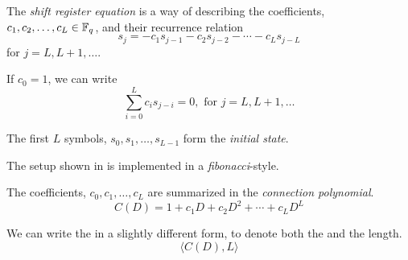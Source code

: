 \begin{definition}\label{def:Shift_Register_Equation}
  The \emph{shift register equation} is a way of describing the coefficients, $c_{1}, c_{2}, \ldots, c_{L} \in \mathbb{F}_{q^{}}$, and their recurrence relation
  \begin{equation}\label{eq:Shift_Register_Equation}
    s_{j} = -c_{1}s_{j-1} - c_{2}s_{j-2} - \cdots - c_{L}s_{j-L}
  \end{equation}
  for $j = L, L+1, \ldots$.

  If  $c_{0} = 1$, we can write
  \begin{equation}\label{eq:Shift_Register_Equation-Summation}
    \sum\limits_{i=0}^{L} c_{i}s_{j-i} = 0, \text{ for } j = L, L+1, \ldots
  \end{equation}

  \begin{remark}\label{rmk:Shift_Register_Initial_State-Fibonacci}
    The first $L$ symbols, $s_{0}, s_{1}, \ldots, s_{L-1}$ form the \emph{initial state}.
  \end{remark}

  \begin{remark}\label{rmk:Shift_Register-Fibonacci}
    The  setup shown in  is implemented in a \emph{fibonacci}-style.
  \end{remark}
\end{definition}

\begin{definition}\label{def:Connection_Polynomial}
  The coefficients, $c_{0}, c_{1}, \ldots, c_{L}$ are summarized in the \emph{connection polynomial}.
  \begin{equation}\label{eq:Connection_Polynomial}
    C(D) = 1 + c_{1}D + c_{2}D^{2} + \cdots + c_{L}D^{L}
  \end{equation}

  \begin{remark}\label{rmk:Connection_Polynomial-Alternate_Form}
    We can write the  in a slightly different form, to denote both the  and the length.
    \begin{equation}\label{eq:Connection_Polynomial-Alternate_Form}
      \langle C(D), L \rangle
    \end{equation}
  \end{remark}
\end{definition}

